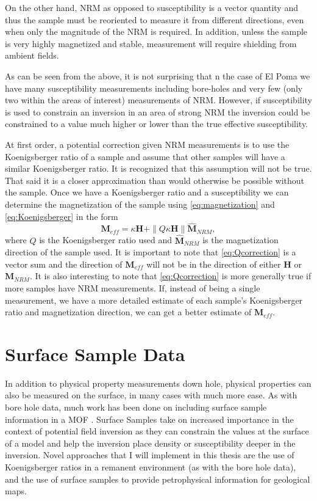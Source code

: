 On the other hand, \ac{NRM} as opposed to susceptibility is a vector quantity and thus the sample must be reoriented to measure it from different directions, even when only the magnitude of the \ac{NRM} is required. In addition, unless the sample is very highly magnetized and stable, measurement will require shielding from ambient fields.

As can be seen from the above, it is not surprising that n the case of El Poma we have many susceptibility measurements including bore-holes and very few (only two within the areas of interest) measurements of \ac{NRM}. However, if susceptibility is used to constrain an inversion in an area of strong \ac{NRM} the inversion could be constrained to a value much higher or lower than the true effective susceptibility. 

At first order, a potential correction given \ac{NRM} measurements is to use the Koenigsberger ratio of a sample and assume that other samples will have a similar Koenigsberger ratio. It is recognized that this assumption will not be true. That said it is a closer approximation than would otherwise be possible without the sample. Once we have a Koenigsberger ratio and a susceptibility we can determine the magnetization of the sample using \autoref{eq:magnetization} and  \autoref{eq:Koenigsberger} in the form
\begin{equation} \label{eq:Qcorrection}
\textbf{M}_{eff} = \kappa\textbf{H} + \|Q\kappa\textbf{H}\|\hat{\mathbf M}_{NRM},
\end{equation}	
where $Q$ is the Koenigsberger ratio used and $\hat{\mathbf M}_{NRM}$ is the magnetization direction of the sample used. It is important to note that \autoref{eq:Qcorrection} is a vector sum and the direction of $\mathbf{M}_{eff}$ will not be in the direction of either $\mathbf H$ or $\mathbf M_{NRM}$. It is also interesting to note that \autoref{eq:Qcorrection} is more generally true if more samples have \ac{NRM} measurements. If, instead of being a single measurement, we have a more detailed estimate of each sample's Koenigsberger ratio and magnetization direction, we can get a better estimate of $\mathbf M_{eff}$.
	
\section{Surface Sample Data}
\label{sec: Surface Sample Data}

In addition to physical property measurements down hole, physical properties can also be measured on the surface, in many cases with much more ease. As with bore hole data, much work  has been done on including surface sample information in a \ac{MOF} \cite{williams2008geologically}. Surface Samples take on increased importance in the context of potential field inversion as they can constrain the values at the surface of a model and help the inversion place density or susceptibility deeper in the inversion. Novel approaches that I will implement in this thesis are the use of Koenigsberger ratios in a remanent environment (as with the bore hole data), and the use of surface samples to provide petrophysical information for geological maps.

